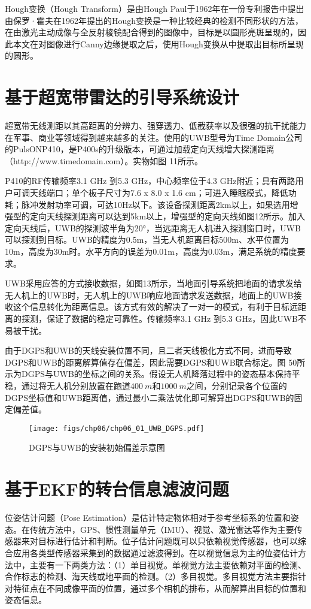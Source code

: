 Hough变换（Hough Transform）是由Hough Paul于1962年在一份专利报告中提出\cite{vc1962method}
由保罗·霍夫在1962年提出的Hough变换是一种比较经典的检测不同形状的方法，在由激光主动成像与全反射棱镜配合得到的图像中，目标是以圆形亮斑呈现的，因此本文在对图像进行Canny边缘提取之后，使用Hough变换从中提取出目标所呈现的圆形。

\section{基于超宽带雷达的引导系统设计}

超宽带无线测距以其高距离的分辨力、强穿透力、低截获率以及很强的抗干扰能力在军事、商业等领域得到越来越多的关注。使用的UWB型号为Time Domain公司的PulsONP410，是P400s的升级版本，可通过加载定向天线增大探测距离（http://www.timedomain.com）。实物如图 11所示。

P410的RF传输频率3.1 GHz 到5.3 GHz，中心频率位于4.3 GHz附近；具有两路用户可调天线端口；单个板子尺寸为7.6 x 8.0 x 1.6 cm；可进入睡眠模式，降低功耗；脉冲发射功率可调，可达10Hz以下。该设备探测距离2km以上，如果选用增强型的定向天线探测距离可以达到5km以上，增强型的定向天线如图12所示。加入定向天线后，UWB的探测波半角为20°，当远距离无人机进入探测窗口时，UWB可以探测到目标。UWB的精度为0.5m，当无人机距离目标500m、水平位置为10m，高度为30m时。水平方向的误差为0.01m，高度为0.03m，满足系统的精度要求。

UWB采用应答的方式接收数据，如图13所示，当地面引导系统把地面的请求发给无人机上的UWB时，无人机上的UWB响应地面请求发送数据，地面上的UWB接收这个信息转化为距离信息。该方式有效的解决了一对一的模式，有利于目标远距离的探测，保证了数据的稳定可靠性。传输频率3.1 GHz 到5.3 GHz，因此UWB不易被干扰。

由于DGPS和UWB的天线安装位置不同，且二者天线极化方式不同，进而导致DGPS和UWB的距离解算值存在偏差，因此需要DGPS和UWB联合标定。图 50所示为DGPS与UWB的坐标之间的关系。假设无人机降落过程中的姿态基本保持平稳，通过将无人机分别放置在跑道$400\ m$和$1000\ m$之间，分别记录各个位置的DGPS坐标值和UWB距离值，通过最小二乘法优化即可解算出DGPS和UWB的固定偏差值。

\begin{figure}[!tb]
	\centering
	\texttt{[image: figs/chp06/chp06\_01\_UWB\_DGPS.pdf]}	
	\caption{DGPS与UWB的安装初始偏差示意图}
	\label{fig:chp06_01_UWB_DGPS}
\end{figure}





\section{基于EKF的转台信息滤波问题}
位姿估计问题（Pose Estimation）是估计特定物体相对于参考坐标系的位置和姿态。在传统方法中，GPS、惯性测量单元（IMU）、视觉、激光雷达等作为主要传感器来对目标进行估计和判断。位子估计问题既可以只依赖视觉传感器，也可以综合应用各类型传感器采集到的数据通过滤波得到。在以视觉信息为主的位姿估计方法中，主要有一下两类方法：（1）单目视觉。单视觉方法主要依赖对平面的检测、合作标志的检测、海天线或地平面的检测。（2）多目视觉。多目视觉方法主要指针对特征点在不同成像平面的位置，通过多个相机的排布，从而解算出目标的位置和姿态信息。

